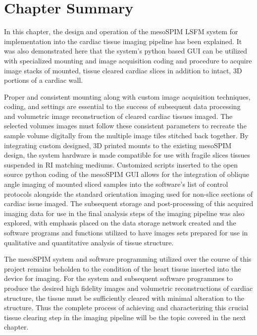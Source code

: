 \section{Chapter Summary}
In this chapter, the design and operation of the mesoSPIM LSFM system for implementation into the cardiac tissue imaging pipeline has been explained. It was also demonstrated here that the system's python based GUI can be utilized with specialized mounting and image acquisition coding and procedure to acquire image stacks of mounted, tissue cleared cardiac slices in addition to intact, 3D portions of a cardiac wall. 

Proper and consistent mounting along with custom image acquisition techniques, coding, and settings are essential to the success of subsequent data processing and volumetric image reconstruction of cleared cardiac tissues imaged. The selected volumes images must follow these consistent parameters to recreate the sample volume digitally from the multiple image tiles stitched back together. By integrating custom designed, 3D printed mounts to the existing mesoSPIM design, the system hardware is made compatible for use with fragile slices tissues suspended in RI matching mediums. Customized scripts inserted to the open source python coding of the mesoSPIM GUI allows for the integration of oblique angle imaging of mounted sliced samples into the software's list of control protocols alongside the standard orientation imaging used for non-slice sections of cardiac issue imaged. The subsequent storage and post-processing of this acquired imaging data for use in the final analysis steps of the imaging pipeline was also explored, with emphasis placed on the data storage network created and the software programs and functions utilized to have images sets prepared for use in qualitative and quantitative analysis of tissue structure.

The mesoSPIM system and software programming utilized over the course of this project remains beholden to the condition of the heart tissue inserted into the device for imaging. For the system and subsequent software programmes to produce the desired high fidelity images and volumetric reconstructions of cardiac structure, the tissue must be sufficiently cleared with minimal alteration to the structure. Thus the complete process of achieving and characterizing this crucial tissue clearing step in the imaging pipeline will be the topic covered in the next chapter. 

